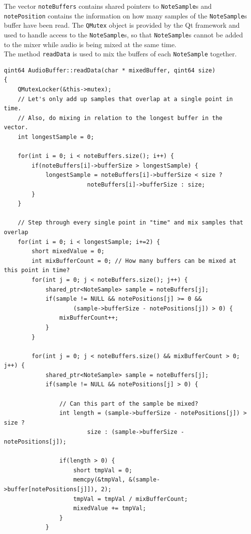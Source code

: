 The vector {\tt noteBuffers} contains shared pointers to {\tt NoteSample}s and \\ 
{\tt notePosition} contains the information on how many samples of the {\tt NoteSample}s 
buffer have been read. 
The {\tt QMutex} object is provided by the Qt framework and used to handle access to the {\tt NoteSample}s, so that {\tt NoteSample}s cannot be added to the mixer while audio is being mixed at the same time.
\\
The method {\tt readData} is used to mix the buffers of each {\tt NoteSample} together. \\
\begin{lstlisting}
qint64 AudioBuffer::readData(char * mixedBuffer, qint64 size)
{
    QMutexLocker(&this->mutex);
    // Let's only add up samples that overlap at a single point in time.
    // Also, do mixing in relation to the longest buffer in the vector.
    int longestSample = 0;

    for(int i = 0; i < noteBuffers.size(); i++) {
        if(noteBuffers[i]->bufferSize > longestSample) {
            longestSample = noteBuffers[i]->bufferSize < size ?
                        noteBuffers[i]->bufferSize : size;
        }
    }

    // Step through every single point in "time" and mix samples that overlap
    for(int i = 0; i < longestSample; i+=2) {
        short mixedValue = 0;
        int mixBufferCount = 0; // How many buffers can be mixed at this point in time?
        for(int j = 0; j < noteBuffers.size(); j++) {
            shared_ptr<NoteSample> sample = noteBuffers[j];
            if(sample != NULL && notePositions[j] >= 0 &&
                    (sample->bufferSize - notePositions[j]) > 0) {
                mixBufferCount++;
            }
        }

        for(int j = 0; j < noteBuffers.size() && mixBufferCount > 0; j++) {
            shared_ptr<NoteSample> sample = noteBuffers[j];
            if(sample != NULL && notePositions[j] > 0) {

                // Can this part of the sample be mixed?
                int length = (sample->bufferSize - notePositions[j]) > size ?
                        size : (sample->bufferSize - notePositions[j]);

                if(length > 0) {
                    short tmpVal = 0;
                    memcpy(&tmpVal, &(sample->buffer[notePositions[j]]), 2);
                    tmpVal = tmpVal / mixBufferCount;
                    mixedValue += tmpVal;
                }
            }


\end{lstlisting}
